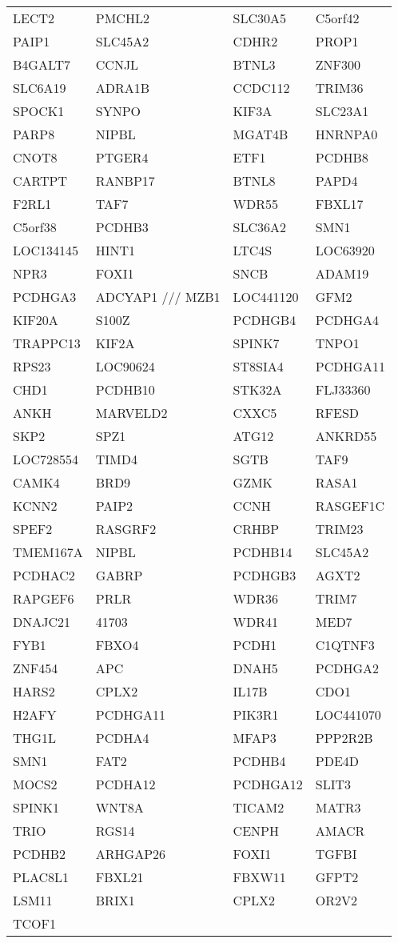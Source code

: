 {\begin{longtable}{llll}
LECT2&PMCHL2&SLC30A5&C5orf42\tabularnewline
PAIP1&SLC45A2&CDHR2&PROP1\tabularnewline
B4GALT7&CCNJL&BTNL3&ZNF300\tabularnewline
SLC6A19&ADRA1B&CCDC112&TRIM36\tabularnewline
SPOCK1&SYNPO&KIF3A&SLC23A1\tabularnewline
PARP8&NIPBL&MGAT4B&HNRNPA0\tabularnewline
CNOT8&PTGER4&ETF1&PCDHB8\tabularnewline
CARTPT&RANBP17&BTNL8&PAPD4\tabularnewline
F2RL1&TAF7&WDR55&FBXL17\tabularnewline
C5orf38&PCDHB3&SLC36A2&SMN1\tabularnewline
LOC134145&HINT1&LTC4S&LOC63920\tabularnewline
NPR3&FOXI1&SNCB&ADAM19\tabularnewline
PCDHGA3&ADCYAP1 /// MZB1&LOC441120&GFM2\tabularnewline
KIF20A&S100Z&PCDHGB4&PCDHGA4\tabularnewline
TRAPPC13&KIF2A&SPINK7&TNPO1\tabularnewline
RPS23&LOC90624&ST8SIA4&PCDHGA11\tabularnewline
CHD1&PCDHB10&STK32A&FLJ33360\tabularnewline
\newpage
ANKH&MARVELD2&CXXC5&RFESD\tabularnewline
SKP2&SPZ1&ATG12&ANKRD55\tabularnewline
LOC728554&TIMD4&SGTB&TAF9\tabularnewline
CAMK4&BRD9&GZMK&RASA1\tabularnewline
KCNN2&PAIP2&CCNH&RASGEF1C\tabularnewline
SPEF2&RASGRF2&CRHBP&TRIM23\tabularnewline
TMEM167A&NIPBL&PCDHB14&SLC45A2\tabularnewline
PCDHAC2&GABRP&PCDHGB3&AGXT2\tabularnewline
RAPGEF6&PRLR&WDR36&TRIM7\tabularnewline
DNAJC21&41703&WDR41&MED7\tabularnewline
FYB1&FBXO4&PCDH1&C1QTNF3\tabularnewline
ZNF454&APC&DNAH5&PCDHGA2\tabularnewline
HARS2&CPLX2&IL17B&CDO1\tabularnewline
H2AFY&PCDHGA11&PIK3R1&LOC441070\tabularnewline
THG1L&PCDHA4&MFAP3&PPP2R2B\tabularnewline
SMN1&FAT2&PCDHB4&PDE4D\tabularnewline
MOCS2&PCDHA12&PCDHGA12&SLIT3\tabularnewline
SPINK1&WNT8A&TICAM2&MATR3\tabularnewline
TRIO&RGS14&CENPH&AMACR\tabularnewline
PCDHB2&ARHGAP26&FOXI1&TGFBI\tabularnewline
PLAC8L1&FBXL21&FBXW11&GFPT2\tabularnewline
LSM11&BRIX1&CPLX2&OR2V2\tabularnewline
TCOF1&&&\tabularnewline
\bottomrule
\end{longtable}}
\addtocounter{table}{-1}
